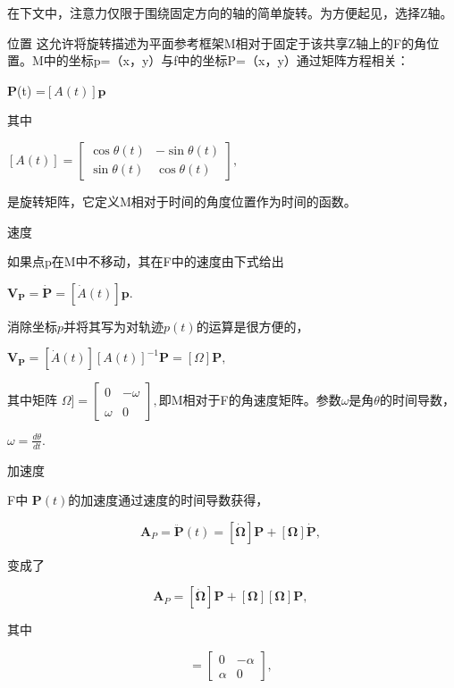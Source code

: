 在下文中，注意力仅限于围绕固定方向的轴的简单旋转。为方便起见，选择Z轴。

位置 
这允许将旋转描述为平面参考框架M相对于固定于该共享Z轴上的F的角位置。M中的坐标p=（x，y）与f中的坐标P=（x，y）通过矩阵方程相关：

$\mathbf{P}$(t) =$[A(t)]\mathbf{p}$

其中

$[A(t)] = \begin{bmatrix}\cos \theta(t) & -\sin \theta(t) \\\sin \theta(t) & \cos \theta(t)\end{bmatrix},$

是旋转矩阵，它定义M相对于时间的角度位置作为时间的函数。

速度

如果点p在M中不移动，其在F中的速度由下式给出

$\mathbf{V_P} = \dot{\mathbf{P}} = [\dot{A}(t)]\mathbf{p}.$

消除坐标$p$并将其写为对轨迹$p(t)$的运算是很方便的，

$\mathbf{V_P} = [\dot{A}(t)][A(t)]^{-1}\mathbf{P} = [\Omega]\mathbf{P},$

其中矩阵 $\Omega] = \begin{bmatrix}0 & -\omega \\\\\omega & 0\end{bmatrix},$即M相对于F的角速度矩阵。参数$\omega$是角$\theta$的时间导数，

$\omega = \frac{d\theta}{dt}.$

加速度

F中  $\mathbf{P}(t)$的加速度通过速度的时间导数获得，

\begin{equation}
\mathbf{A}_P = \ddot{\mathbf{P}}(t) = [\dot{\mathbf{\Omega}}] \mathbf{P} + [\mathbf{\Omega}] \dot{\mathbf{P}},~
\end{equation}

变成了

\begin{equation}
\mathbf{A}_P = [\dot{\mathbf{\Omega}}] \mathbf{P} + [\mathbf{\Omega}][\mathbf{\Omega}] \mathbf{P},~
\end{equation}

其中

\begin{equation}
[\dot{\mathbf{\Omega}}] = 
\begin{bmatrix}
0 & -\alpha \\
\alpha & 0
\end{bmatrix},~
\end{equation}

